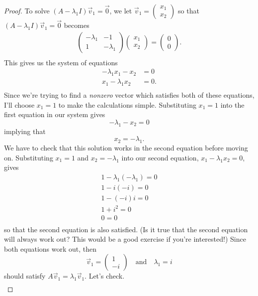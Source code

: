 \documentclass{article}
\begin{document}
\begin{proof}
To solve $\left(A - \lambda_1I\right)\vec{v}_1 = \vec{0}$, we let $\vec{v}_1 = \begin{pmatrix}x_1\\x_2\end{pmatrix}$ so that $\left(A - \lambda_1I\right)\vec{v}_1 = \vec{0}$ becomes
\begin{align*}
\begin{pmatrix}-\lambda_1&-1\\1&-\lambda_1\end{pmatrix}\begin{pmatrix}x_1\\x_2\end{pmatrix} = \begin{pmatrix}0\\0\end{pmatrix}.\\
\end{align*}
This gives us the system of equations
\begin{align*}
-\lambda_1 x_1 - x_2 &= 0\\
x_1 - \lambda_1 x_2 &= 0.\\
\end{align*}
Since we're trying to find a \textit{nonzero} vector which satisfies both of these equations, I'll choose $x_1 = 1$ to make the calculations simple. Substituting $x_1 = 1$ into the first equation in our system gives $$-\lambda_1 - x_2 = 0$$ implying that $$x_2 = -\lambda_1.$$ We have to check that this solution works in the second equation before moving on. Substituting $x_1 = 1$ and $x_2 = -\lambda_1$ into our second equation, $x_1 - \lambda_1 x_2 = 0$, gives 
\begin{align*}
1 - \lambda_1 \left(-\lambda_1\right) = 0\\
1 - i \left(-i\right) = 0\\
1 - \left(-i\right) i = 0\\
1 + i^2 = 0\\
0 = 0\\
\end{align*}
so that the second equation is also satisfied. (Is it true that the second equation will always work out? This would be a good exercise if you're interested!) Since both equations work out, then $$\vec{v}_1 = \begin{pmatrix}1\\-i\end{pmatrix} \quad \text{and} \quad \lambda_1 = i$$ should satisfy $A\vec{v}_1 = \lambda_1 \vec{v}_1$. Let's check.
\begin{align*}

\end{align*}
\end{proof}
\end{document}

